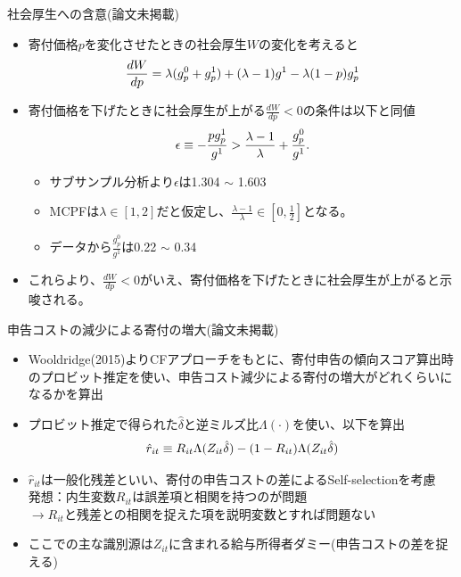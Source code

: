\documentclass[dvipdfmx,10pt]{beamer}
\begin{document}
\begin{frame}{社会厚生への含意(論文未掲載)}
	\begin{itemize}
		\item 寄付価格$p$を変化させたときの社会厚生$W$の変化を考えると
		\begin{align}
			\frac{dW}{dp} =\lambda (g_p^0+g_p^1)+(\lambda-1)g^1-\lambda(1-p)g_p^1\notag
		\end{align}
		\item 寄付価格を下げたときに社会厚生が上がる$\frac{dW}{dp}<0$の条件は以下と同値
		\begin{align}
			\epsilon\equiv -\frac{pg_p^1}{g^1}>\frac{\lambda-1}{\lambda}+\frac{g_p^0}{g^1}\notag.
		\end{align}
		\begin{itemize}
		\item サブサンプル分析より$\epsilon$は1.304 $\sim$ 1.603
		\item MCPFは$\lambda\in[1,2]$だと仮定し、$\frac{\lambda-1}{\lambda}\in[0,\frac12]$となる。
		\item データから$\frac{g_p^0}{g^1}$は0.22 $\sim$ 0.34
		\end{itemize}
		\item これらより、$\frac{dW}{dp}<0$がいえ、寄付価格を下げたときに社会厚生が上がると示唆される。
	\end{itemize}
\end{frame}



\begin{frame}{申告コストの減少による寄付の増大(論文未掲載)}
	\begin{itemize}
		\item Wooldridge(2015)よりCFアプローチをもとに、寄付申告の傾向スコア算出時のプロビット推定を使い、申告コスト減少による寄付の増大がどれくらいになるかを算出
		\item プロビット推定で得られた$\hat{\delta}$と逆ミルズ比$\Lambda(\cdot)$を使い、以下を算出
		\begin{align}
			\hat{r}_{it}\equiv R_{it}\Lambda(Z_{it}\hat{\delta})-(1-R_{it})\Lambda(Z_{it}\hat{\delta})\notag
		\end{align}
		\item $\hat{r}_{it}$は一般化残差といい、寄付の申告コストの差によるSelf-selectionを考慮\\
		発想：内生変数$R_{it}$は誤差項と相関を持つのが問題\\
		\qquad$\to$$R_{it}$と残差との相関を捉えた項を説明変数とすれば問題ない
		\item ここでの主な識別源は$Z_{it}$に含まれる給与所得者ダミー(申告コストの差を捉える)
	\end{itemize}
\end{frame}
\end{document}

